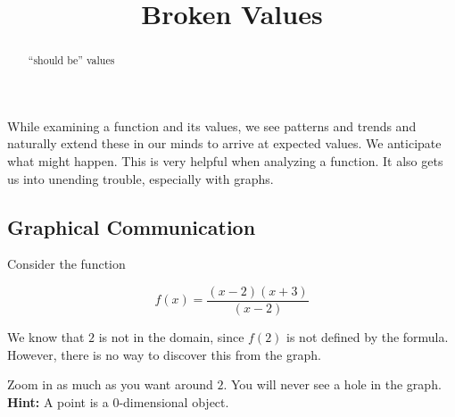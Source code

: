 \documentclass{ximera}
\title{Broken Values}
\begin{document}
\begin{abstract}
``should be'' values
\end{abstract}
\maketitle






While examining a function and its values, we see patterns and trends and naturally extend these in our minds to arrive at expected values. We anticipate what might happen.  This is very helpful when analyzing a function. It also gets us into unending trouble, especially with graphs.






\subsection*{Graphical Communication}


Consider the function 

\[ f(x) = \frac{(x-2)(x+3)}{(x-2)} \]

We know that $2$ is not in the domain, since $f(2)$ is not defined  by the formula.  However, there is no way to discover this from the graph.


Zoom in as much as you want around $2$. You will never see a hole in the graph.   \\
\textbf{Hint:} A point is a $0$-dimensional object. 








\begin{image}
\end{image}
\end{document}
